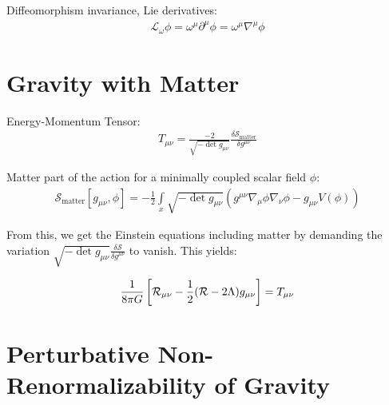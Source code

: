Diffeomorphism invariance, Lie derivatives:
\begin{align}
	\mathcal{L}_{\omega}\phi = \omega^{\mu}\partial^{\mu}\phi = \omega^{\mu}\nabla^{\mu}\phi
\end{align}

\section{Gravity with Matter} 

Energy-Momentum Tensor:
\begin{align}
	T_{\mu\nu} = \frac{-2}{\sqrt{-\operatorname{det}g_{\mu\nu}}} \frac{\delta\mathcal{S}_{\text{matter}}}{\delta g^{\mu\nu}}
\end{align}

Matter part of the action for a minimally coupled scalar field $\phi$:
\begin{align}
	\mathcal{S}_{\text{matter}}[g_{\mu\nu}, \phi] = -\frac{1}{2} \int\limits_x \sqrt{-\operatorname{det}g_{\mu\nu}}\left( g^{\mu\nu}\nabla_{\mu}\phi\nabla_{\nu}\phi - g_{\mu\nu} V(\phi) \right)
\end{align}

From this, we get the Einstein equations including matter by demanding the variation $\sqrt{-\operatorname{det}g_{\mu\nu}}\frac{\delta\mathcal{S}}{\delta g^{\mu\nu}}$ to vanish. This yields:

\begin{align}
\frac{1}{8\pi G}\left[\mathcal{R}_{\mu\nu} - \frac{1}{2}(\mathcal{R} - 2\Lambda)g_{\mu\nu}\right] = T_{\mu\nu}	
\end{align}


\section{Perturbative Non-Renormalizability of Gravity}

